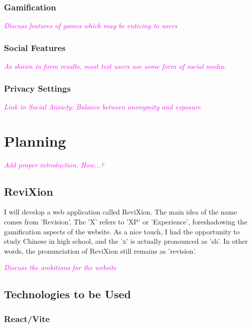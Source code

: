 \documentclass{report}
\begin{document}
\subsection{Gamification}

\textcolor{magenta}{\textit{Discuss features of games which may be enticing to users}}

\subsection{Social Features}

\textcolor{magenta}{\textit{As shown in form results, most test users use some form of social media.}}

\subsection{Privacy Settings}

\textcolor{magenta}{\textit{Link to Social Anxiety: Balance between anonymity and exposure}}



\chapter{Planning}

\textcolor{magenta}{\textit{Add proper introduction. How...?}}

\section{ReviXion}

I will develop a web application called ReviXion.
The main idea of the name comes from 'Revision'.
The 'X' refers to 'XP' or 'Experience', foreshadowing the gamification aspects of the website.
As a nice touch, I had the opportunity to study Chinese in high school, and the 'x' is actually pronounced as 'sh'.
In other words, the pronunciation of ReviXion still remains as 'revision'.

\textcolor{magenta}{\textit{Discuss the ambitions for the website}}

\section{Technologies to be Used}

\subsection{React/Vite}
\end{document}
